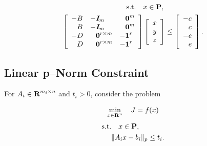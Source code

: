 \documentclass{article}
\begin{document}
    \begin{align*}
        \st\quad &x\in\poly,\\
        \left[\begin{array}{lll}
                -B
            &
                -\eye_m
            &
                \minus \zeros^{m}
            \\
                \minus B
            &
                -\eye_m
            &
                \minus \zeros^{m}
            \\
                -D
            &
                \minus \zeros^{r\times m}
            &
                -\ones^{r}
            \\
                \minus D 
            & 
                \minus \zeros^{r\times m}
            &
                -\ones^{r}
        \end{array}\right]
        &
        \left[\begin{array}{c}
            x   \\
            y   \\
            z
        \end{array}\right]
        \leq
        \left[\begin{array}{l}
            -c                \\
            \minus c      \\
            -e           \\
            \minus e
        \end{array}\right].
    \end{align*}

\subsection{Linear p--Norm Constraint} \label{sec:lin_p_norm}


    For $A_i\in\textbf{R}^{m_i\times n}$ and $t_i>0$, consider the problem

    \begin{align*}
        \min_{x\in\textbf{R}^n} \quad J = f(x)
    \end{align*}
    \begin{align}
        \text{s.t.}\quad x&\in\textbf{P},\nonumber\\
        \|A_i&x-b_i\|_p\leq t_i.\label{eqn:p_norm_constraint}
    \end{align}
\end{document}
